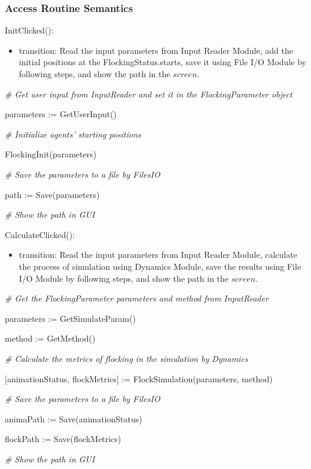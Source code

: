 \documentclass[12pt, titlepage]{article}
\begin{document}
\subsubsection{Access Routine Semantics}

\noindent InitClicked():
\begin{itemize}
\item transition: Read the input parameters from Input Reader Module, add the 
initial positions at the FlockingStatus.starts, save it using File I/O Module 
by following steps, and show the path in the $screen$. 
\end{itemize}
\textit{\# Get user input from InputReader and set it in the FlockingParameter object}

parameters :=  GetUserInput()

\textit{\# Initialize agents' starting positions}

FlockingInit(parameters)

\textit{\# Save the parameters to a file by FilesIO}

path := Save(parameters)

\textit{\# Show the path in GUI}

\vspace{2em}

\noindent CalculateClicked():

\begin{itemize}
\item transition: Read the input parameters from Input Reader Module, calculate 
the process of simulation using Dynamics Module, save the results using 
File I/O Module by following steps, and show the path in the $screen$. 
\end{itemize}
\textit{\# Get the FlockingParameter parameters and method from InputReader}

parameters :=  GetSimulateParam()

method := GetMethod()

\textit{\# Calculate the metrics of flocking in the simulation by Dynamics}

[animationStatus, flockMetrics] := FlockSimulation(parameters, method)

\textit{\# Save the parameters to a file by FilesIO}

animaPath := Save(animationStatus)

flockPath := Save(flockMetrics)

\textit{\# Show the path in GUI}

\vspace{2em}
\end{document}

